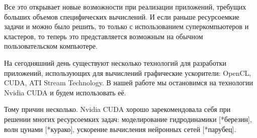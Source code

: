 Все это открывает новые возможности при реализации приложений, требущих больших объемов специфических вычислений. И если раньше ресурсоемкие задачи и можно было решить, то только с использованием суперкомпьютеров и кластеров, то теперь это представляется возможным на обычном пользовательском  компьютере. 

На сегодняшний день существуют несколько технологий для разработки приложений, использующих для вычислений графические ускорители: OpenCL, CUDA, ATI Stream Technology. В нашей работе мы остановимся на технологии Nvidia CUDA и будем использовать её. 

Тому причин несколько. Nvidia CUDA хорошо зарекомендовала себя при решении многих ресурсоемких задач: моделирование гидродинамики [*березин], волн цунами [*курако], ускорение вычисления нейронных сетей [*парубец].



